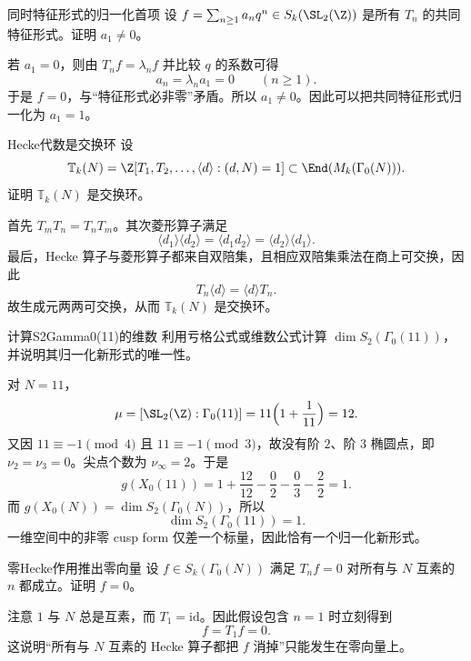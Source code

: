 \begin{problem}{同时特征形式的归一化首项}
设 $f=\sum_{n\ge1}a_nq^n\in S_k(\SL_2(\Z))$ 是所有 $T_n$ 的共同特征形式。证明 $a_1\neq0$。
\end{problem}
\begin{solution}
若 $a_1=0$，则由 $T_nf=\lambda_nf$ 并比较 $q$ 的系数可得
\[
a_n=\lambda_n a_1=0\qquad (n\ge1).
\]
于是 $f=0$，与“特征形式必非零”矛盾。所以 $a_1\neq0$。因此可以把共同特征形式归一化为 $a_1=1$。
\end{solution}

\begin{problem}{Hecke代数是交换环}
设
\[
\mathbb{T}_k(N)=\Z[T_1,T_2,\dots,\langle d\rangle:(d,N)=1]\subset\End(M_k(\Gamma_0(N))).
\]
证明 $\mathbb{T}_k(N)$ 是交换环。
\end{problem}
\begin{solution}
首先 $T_mT_n=T_nT_m$。其次菱形算子满足
\[
\langle d_1\rangle\langle d_2\rangle=\langle d_1d_2\rangle=\langle d_2\rangle\langle d_1\rangle.
\]
最后，Hecke 算子与菱形算子都来自双陪集，且相应双陪集乘法在商上可交换，因此
\[
T_n\langle d\rangle=\langle d\rangle T_n.
\]
故生成元两两可交换，从而 $\mathbb{T}_k(N)$ 是交换环。
\end{solution}

\begin{problem}{计算S2Gamma0(11)的维数}
利用亏格公式或维数公式计算 $\dim S_2(\Gamma_0(11))$，并说明其归一化新形式的唯一性。
\end{problem}
\begin{solution}
对 $N=11$，
\[
\mu=[\SL_2(\Z):\Gamma_0(11)]=11\Bigl(1+\frac1{11}\Bigr)=12.
\]
又因 $11\equiv -1\pmod4$ 且 $11\equiv -1\pmod3$，故没有阶 $2$、阶 $3$ 椭圆点，即 $\nu_2=\nu_3=0$。尖点个数为 $\nu_\infty=2$。于是
\[
g(X_0(11))=1+\frac{12}{12}-\frac02-\frac03-\frac22=1.
\]
而 $g(X_0(N))=\dim S_2(\Gamma_0(N))$，所以
\[
\dim S_2(\Gamma_0(11))=1.
\]
一维空间中的非零 cusp form 仅差一个标量，因此恰有一个归一化新形式。
\end{solution}

\begin{problem}{零Hecke作用推出零向量}
设 $f\in S_k(\Gamma_0(N))$ 满足 $T_nf=0$ 对所有与 $N$ 互素的 $n$ 都成立。证明 $f=0$。
\end{problem}
\begin{solution}
注意 $1$ 与 $N$ 总是互素，而 $T_1=\mathrm{id}$。因此假设包含 $n=1$ 时立刻得到
\[
f=T_1f=0.
\]
这说明“所有与 $N$ 互素的 Hecke 算子都把 $f$ 消掉”只能发生在零向量上。
\end{solution}

